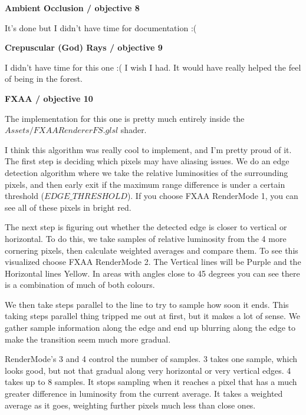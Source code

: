 \documentclass[10pt]{article}
\begin{document}
	\begin{center}
		\bf Ambient Occlusion / objective 8
	\end{center}
	
	It's done but I didn't have time for documentation :(
	
	\begin{center}
		\bf Crepuscular (God) Rays / objective 9
	\end{center}
	
	I didn't have time for this one :( I wish I had. It would have really helped the feel of being in the forest. 
	
	\begin{center}
		\bf FXAA / objective 10
	\end{center}
	
	The implementation for this one is pretty much entirely inside the $Assets/FXAARendererFS.glsl$ shader.
	
	I think this algorithm was really cool to implement, and I'm pretty proud of it. The first step is deciding which pixels may have aliasing issues. We do an edge detection algorithm where we take the relative luminosities of the surrounding pixels, and then early exit if the maximum range difference is under a certain threshold ($EDGE\_THRESHOLD$). If you choose FXAA RenderMode 1, you can see all of these pixels in bright red.
	
	The next step is figuring out whether the detected edge is closer to vertical or horizontal. To do this, we take samples of relative luminosity from the 4 more cornering pixels, then calculate weighted averages and compare them. To see this visualized choose FXAA RenderMode 2. The Vertical lines will be Purple and the Horizontal lines Yellow. In areas with angles close to 45 degrees you can see there is a combination of much of both colours.
	
	We then take steps parallel to the line to try to sample how soon it ends. This taking steps parallel thing tripped me out at first, but it makes a lot of sense. We gather sample information along the edge and end up blurring along the edge to make the transition seem much more gradual.
	
	RenderMode's 3 and 4 control the number of samples. 3 takes one sample, which looks good, but not that gradual along very horizontal or very vertical edges. 4 takes up to 8 samples. It stops sampling when it reaches a pixel that has a much greater difference in luminosity from the current average. It takes a weighted average as it goes, weighting further pixels much less than close ones.
\end{document}
